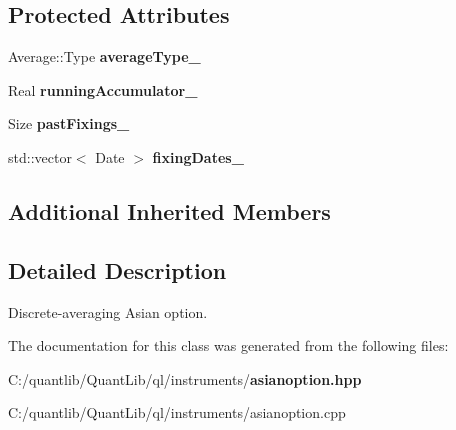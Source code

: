 \subsection*{Protected Attributes}
\begin{DoxyCompactItemize}
\item 
Average\+::\+Type {\bfseries average\+Type\+\_\+}\label{class_quant_lib_1_1_discrete_averaging_asian_option_a9b654baa0a85dd721e712e2a6dc8a82a}

\item 
Real {\bfseries running\+Accumulator\+\_\+}\label{class_quant_lib_1_1_discrete_averaging_asian_option_ae74336699bc04b62758a24bb9ee37c46}

\item 
Size {\bfseries past\+Fixings\+\_\+}\label{class_quant_lib_1_1_discrete_averaging_asian_option_ae66566eb1a26d6459354ba85dde6da64}

\item 
std\+::vector$<$ Date $>$ {\bfseries fixing\+Dates\+\_\+}\label{class_quant_lib_1_1_discrete_averaging_asian_option_ab9d72c951a8955bfc31161908f912738}

\end{DoxyCompactItemize}
\subsection*{Additional Inherited Members}


\subsection{Detailed Description}
Discrete-\/averaging Asian option. 



The documentation for this class was generated from the following files\+:\begin{DoxyCompactItemize}
\item 
C\+:/quantlib/\+Quant\+Lib/ql/instruments/{\bf asianoption.\+hpp}\item 
C\+:/quantlib/\+Quant\+Lib/ql/instruments/asianoption.\+cpp\end{DoxyCompactItemize}

